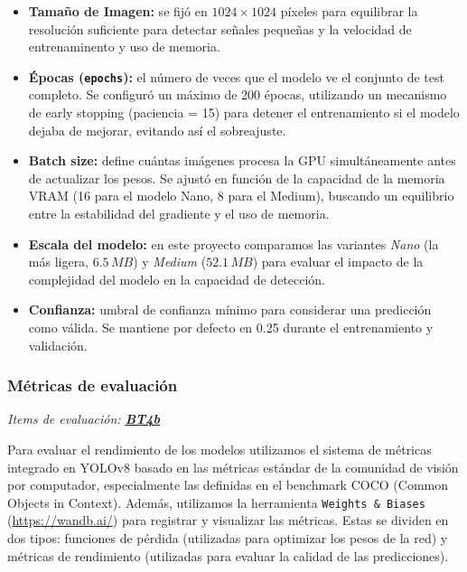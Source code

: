 \documentclass[11pt,a4paper]{article}
\begin{document}
\begin{itemize}
    \item \textbf{Tamaño de Imagen:} se fijó en $1024 \times 1024$ píxeles para equilibrar la resolución suficiente para detectar señales pequeñas
            y la velocidad de entrenaminento y uso de memoria.
    
    \item \textbf{Épocas (\texttt{epochs}):} el número de veces que el modelo ve el conjunto de test completo. 
     Se configuró un máximo de 200 épocas, utilizando un mecanismo de early stopping
     (paciencia = 15) para detener el entrenamiento si el modelo dejaba de mejorar, 
     evitando así el sobreajuste.
    
    \item \textbf{Batch size:} define cuántas imágenes procesa la GPU simultáneamente antes de actualizar 
    los pesos. Se ajustó en función de la capacidad de la memoria VRAM (16 para el modelo Nano, 8 para el Medium), 
    buscando un equilibrio entre la estabilidad del gradiente y el uso de memoria.
    
    \item \textbf{Escala del modelo:} en este proyecto comparamos las variantes 
    \textit{Nano} (la más ligera, $6.5\, MB$) y \textit{Medium} ($52.1\, MB$) para evaluar el impacto de la complejidad 
    del modelo en la capacidad de detección.

    \item \textbf{Confianza:} umbral de confianza mínimo para considerar una predicción como válida.
    Se mantiene por defecto en 0.25 durante el entrenamiento y validación.
\end{itemize}

\subsubsection{Métricas de evaluación}

\textit{Items de evaluación: \underline{\textbf{BT4b}}}

Para evaluar el rendimiento de los modelos utilizamos
el sistema de métricas integrado en YOLOv8 basado en las métricas estándar de la comunidad
de visión por computador, especialmente las definidas en el benchmark COCO (Common Objects in Context).
Además, utilizamos la herramienta \texttt{Weights \& Biases} (\url{https://wandb.ai/}) para registrar y visualizar las métricas. Estas
se dividen en dos tipos: funciones de pérdida (utilizadas para optimizar los pesos de la red) y
métricas de rendimiento (utilizadas para evaluar la calidad de las predicciones).
\end{document}

